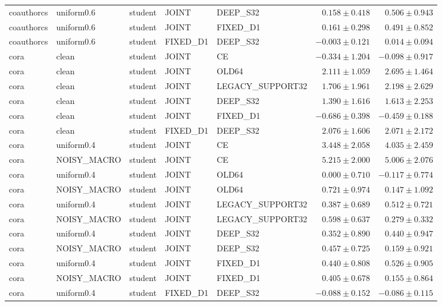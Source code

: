 \begin{longtable}{lllllrr}
coauthorcs & uniform0.6 & student & JOINT & DEEP\_S32 & $0.158 \pm 0.418$ & $0.506 \pm 0.943$ \\
coauthorcs & uniform0.6 & student & JOINT & FIXED\_D1 & $0.161 \pm 0.298$ & $0.491 \pm 0.852$ \\
coauthorcs & uniform0.6 & student & FIXED\_D1 & DEEP\_S32 & $-0.003 \pm 0.121$ & $0.014 \pm 0.094$ \\
cora & clean & student & JOINT & CE & $-0.334 \pm 1.204$ & $-0.098 \pm 0.917$ \\
cora & clean & student & JOINT & OLD64 & $2.111 \pm 1.059$ & $2.695 \pm 1.464$ \\
cora & clean & student & JOINT & LEGACY\_SUPPORT32 & $1.706 \pm 1.961$ & $2.198 \pm 2.629$ \\
cora & clean & student & JOINT & DEEP\_S32 & $1.390 \pm 1.616$ & $1.613 \pm 2.253$ \\
cora & clean & student & JOINT & FIXED\_D1 & $-0.686 \pm 0.398$ & $-0.459 \pm 0.188$ \\
cora & clean & student & FIXED\_D1 & DEEP\_S32 & $2.076 \pm 1.606$ & $2.071 \pm 2.172$ \\
cora & uniform0.4 & student & JOINT & CE & $3.448 \pm 2.058$ & $4.035 \pm 2.459$ \\
cora & NOISY\_MACRO & student & JOINT & CE & $5.215 \pm 2.000$ & $5.006 \pm 2.076$ \\
cora & uniform0.4 & student & JOINT & OLD64 & $0.000 \pm 0.710$ & $-0.117 \pm 0.774$ \\
cora & NOISY\_MACRO & student & JOINT & OLD64 & $0.721 \pm 0.974$ & $0.147 \pm 1.092$ \\
cora & uniform0.4 & student & JOINT & LEGACY\_SUPPORT32 & $0.387 \pm 0.689$ & $0.512 \pm 0.721$ \\
cora & NOISY\_MACRO & student & JOINT & LEGACY\_SUPPORT32 & $0.598 \pm 0.637$ & $0.279 \pm 0.332$ \\
cora & uniform0.4 & student & JOINT & DEEP\_S32 & $0.352 \pm 0.890$ & $0.440 \pm 0.947$ \\
cora & NOISY\_MACRO & student & JOINT & DEEP\_S32 & $0.457 \pm 0.725$ & $0.159 \pm 0.921$ \\
cora & uniform0.4 & student & JOINT & FIXED\_D1 & $0.440 \pm 0.808$ & $0.526 \pm 0.905$ \\
cora & NOISY\_MACRO & student & JOINT & FIXED\_D1 & $0.405 \pm 0.678$ & $0.155 \pm 0.864$ \\
cora & uniform0.4 & student & FIXED\_D1 & DEEP\_S32 & $-0.088 \pm 0.152$ & $-0.086 \pm 0.115$ \\

\end{longtable}
